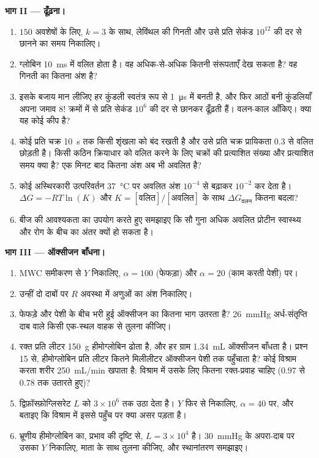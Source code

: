 \begin{problem}
\medskip
\noindent\textbf{भाग II ---  ढूँढ़ना।}
\begin{enumerate}[resume]
  \item $150$ अवशेषों के लिए, $k = 3$ के साथ, लेविंथल की गिनती और
        उसे प्रति सेकंड $10^{12}$ की दर से छानने का समय निकालिए।
  \item ग्लोबिन \qty{10}{ms} में वलित होता है। वह अधिक-से-अधिक कितनी
        संरूपताएँ देख सकता है? वह गिनती का कितना अंश है?
  \item इसके बजाय मान लीजिए हर कुंडली स्वतंत्र रूप से
        \qty{1}{\micro s} में बनती है, और फिर आठों बनी कुंडलियाँ अपना
        जमाव $8!$ क्रमों में से प्रति सेकंड $10^{6}$ की दर से छानकर
        ढूँढ़ती हैं। वलन-काल आँकिए। क्या यह कोई कीप है?
  \item कोई  प्रति चक्र \qty{10}{s} तक किसी शृंखला को बंद
        रखती है और उसे प्रति चक्र प्रायिकता $0.3$ से वलित छोड़ती है।
        किसी कठिन क्रियाधार को वलित करने के लिए चक्रों की प्रत्याशित
        संख्या और प्रत्याशित समय क्या है? एक मिनट बाद कितना अंश अब भी
        अवलित है?
  \item कोई अस्थिरकारी उत्परिवर्तन \qty{37}{\celsius} पर अवलित अंश
        $10^{-4}$ से बढ़ाकर $10^{-2}$ कर देता है। $\Delta G =
        -RT\ln(K)$ और $K = [\text{वलित}]/[\text{अवलित}]$ के साथ
        $\Delta G_{\text{वलन}}$ कितना बदला?
  \item बीज की आवश्यकता का उपयोग करते हुए समझाइए कि सौ गुना अधिक अवलित
        प्रोटीन स्वास्थ्य और  रोग के बीच का अंतर क्यों हो सकता
        है।
\end{enumerate}

\medskip
\noindent\textbf{भाग III --- ऑक्सीजन बाँधना।}
\begin{enumerate}[resume]
  \item MWC समीकरण से $Y$ निकालिए, $\alpha = 100$ (फेफड़ा) और
        $\alpha = 20$ (काम करती पेशी) पर।
  \item उन्हीं दो दाबों पर $R$ अवस्था में अणुओं का अंश निकालिए।
  \item फेफड़े और पेशी के बीच भरी हुई ऑक्सीजन का कितना भाग उतरता है?
        \qty{26}{mmHg} अर्ध-संतृप्ति दाब वाले किसी एक-स्थल वाहक से
        तुलना कीजिए।
  \item रक्त प्रति लीटर \qty{150}{g} हीमोग्लोबिन ढोता है, और हर ग्राम
        \qty{1.34}{mL} ऑक्सीजन बाँधता है। प्रश्न 15 से, हीमोग्लोबिन
        प्रति लीटर कितने मिलीलीटर ऑक्सीजन पेशी तक पहुँचाता है? कोई
        विश्राम करता शरीर \qty{250}{mL/min} खपाता है: विश्राम में उसके
        लिए कितना रक्त-प्रवाह चाहिए ($0.97$ से $0.78$ तक उतारते हुए)?
  \item द्विफ़ॉस्फ़ोग्लिसरेट $L$ को $3\times 10^{6}$ तक उठा देता है।
        $Y$ फिर से निकालिए, $\alpha = 40$ पर, और बताइए कि विश्राम में
        इससे पहुँच पर क्या असर पड़ता है।
  \item भ्रूणीय हीमोग्लोबिन का, प्रभाव की दृष्टि से, $L = 3\times 10^{4}$
        है। \qty{30}{mmHg} के अपरा-दाब पर उसका $Y$ निकालिए, माता के
        साथ तुलना कीजिए, और स्थानांतरण समझाइए।
\end{enumerate}


\end{problem}
